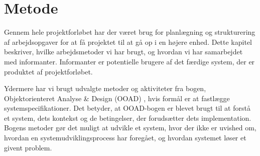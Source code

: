 \chapter{Metode}
\label{chap:metode}

Gennem hele projektforløbet har der været brug for planlægning og strukturering af arbejdsopgaver for at få projektet til at gå op i en højere enhed. Dette kapitel beskriver, hvilke arbejdsmetoder vi har brugt, og hvordan vi har samarbejdet med informanter. Informanter er potentielle brugere af det færdige system, der er produktet af projektforløbet.

Ydermere har vi brugt udvalgte metoder og aktiviteter fra bogen, Objektorienteret Analyse \& Design (OOAD) \cite{ooad}, hvis formål er at fastlægge systemspecifikationer. Det betyder, at OOAD-bogen er blevet brugt til at forstå et system, dets kontekst og de betingelser, der forudsætter dets implementation. Bogens metoder gør det muligt at udvikle et system, hvor der ikke er uvished om, hvordan en systemudviklingsprocess har foregået, og hvordan systemet løser et givent problem.




